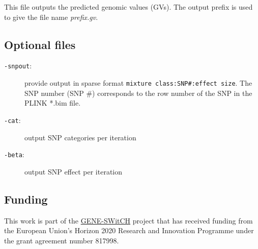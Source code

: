 \documentclass{ol-softwaremanual}
\begin{document}
This file outputs the predicted genomic values (GVs). The output prefix is used to give the file name \textit{prefix.gv}.  

\subsection{Optional files}

\begin{description}
    \item[\texttt{-snpout}:] provide output in sparse format \texttt{mixture class:SNP#:effect size}. The SNP number (SNP \#) corresponds to the row number of the SNP in the PLINK *.bim file. 
    \item[\texttt{-cat}:] output SNP categories per iteration 
    \item[\texttt{-beta}:] output SNP effect per iteration
\end{description}




\subsection*{Funding}

This work is part of the \href{https://www.gene-switch.eu/}{GENE-SWitCH} project that has received funding from the European Union’s Horizon 2020 Research and
Innovation Programme under the grant agreement number 817998. 
\end{document}
